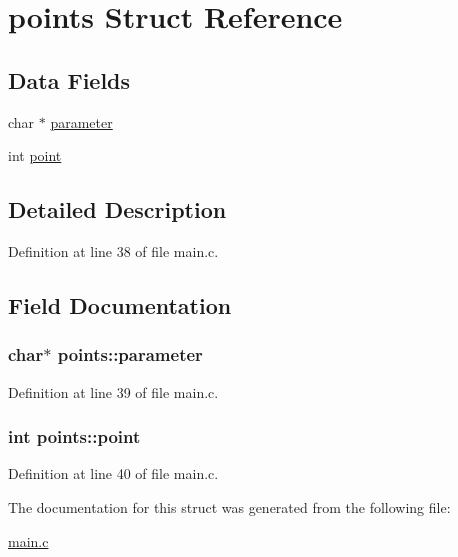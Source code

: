 \hypertarget{structpoints}{\section{points Struct Reference}
\label{structpoints}
}
\subsection*{Data Fields}
\begin{DoxyCompactItemize}
\item 
char $\ast$ \hyperlink{structpoints_a006c88452ba4166f7aecf4e7c6d13cb7}{parameter}
\item 
int \hyperlink{structpoints_a41c32110b6e598eefc21bf4d775aec85}{point}
\end{DoxyCompactItemize}


\subsection{Detailed Description}


Definition at line 38 of file main.\+c.



\subsection{Field Documentation}
\hypertarget{structpoints_a006c88452ba4166f7aecf4e7c6d13cb7}{
\subsubsection[{parameter}]{\setlength{\rightskip}{0pt plus 5cm}char$\ast$ points\+::parameter}}\label{structpoints_a006c88452ba4166f7aecf4e7c6d13cb7}


Definition at line 39 of file main.\+c.

\hypertarget{structpoints_a41c32110b6e598eefc21bf4d775aec85}{
\subsubsection[{point}]{\setlength{\rightskip}{0pt plus 5cm}int points\+::point}}\label{structpoints_a41c32110b6e598eefc21bf4d775aec85}


Definition at line 40 of file main.\+c.



The documentation for this struct was generated from the following file\+:\begin{DoxyCompactItemize}
\item 
\hyperlink{main_8c}{main.\+c}\end{DoxyCompactItemize}
